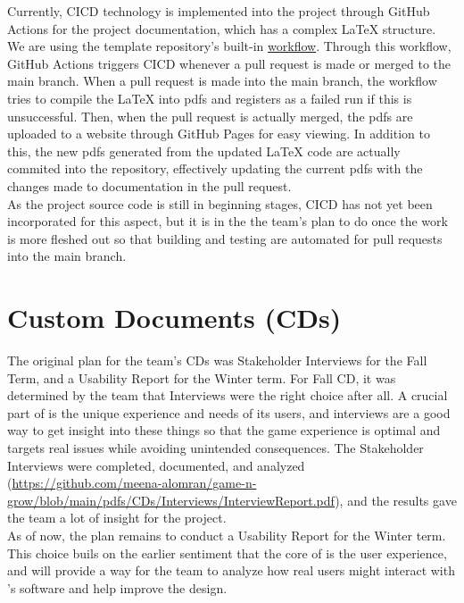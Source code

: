 \documentclass{article}
\begin{document}
Currently, CICD technology is implemented into the project through GitHub Actions for the project documentation, which has a complex \LaTeX{} structure. We
are using the template repository's built-in \href{https://github.com/meena-alomran/game-n-grow/blob/main/.github/workflows/latex-pages.yml}{workflow}. Through this workflow,
GitHub Actions triggers CICD whenever a pull request is made or merged to the main branch. When a pull request is made into the main branch, the workflow tries to compile the \LaTeX{} into pdfs
and registers as a failed run if this is unsuccessful. Then, when the pull request is actually merged, the pdfs are uploaded to a website through GitHub Pages for easy viewing. In addition to this, 
the new pdfs generated from the updated \LaTeX{} code are actually commited into the repository, effectively updating the current pdfs with the changes made to documentation in the pull request.\\
As the project source code is still in beginning stages, CICD has not yet been incorporated for this aspect, but it is in the the team's plan to do once the work is more fleshed out so that building and testing are automated for pull requests into the main branch.

\section{Custom Documents (CDs)}

The original plan for the team's CDs was Stakeholder Interviews for the Fall Term, and a Usability Report for the Winter term.
For Fall CD, it was determined by the team that Interviews were the right choice after all. A crucial part of \progname{} is the unique experience and needs of its users, and interviews
are a good way to get insight into these things so that the game experience is optimal and targets real issues while avoiding unintended consequences. The Stakeholder Interviews were completed, documented, and analyzed (\url{https://github.com/meena-alomran/game-n-grow/blob/main/pdfs/CDs/Interviews/InterviewReport.pdf}), and
the results gave the team a lot of insight for the project.\\
As of now, the plan remains to conduct a Usability Report for the Winter term. This choice buils on the earlier sentiment that the core of \progname{} is the user experience, and will provide a way for the team to analyze how real users might interact with \progname's software and help improve the design.
\end{document}
